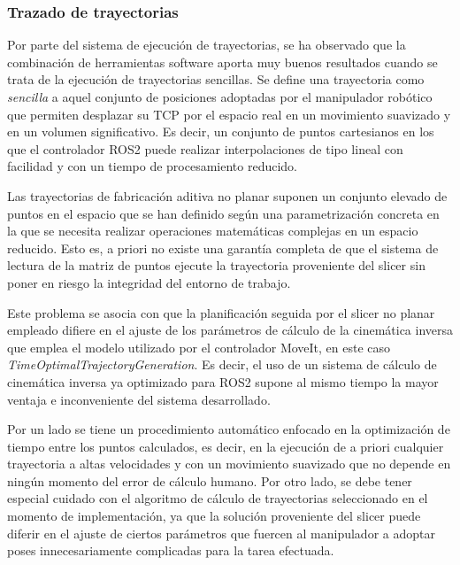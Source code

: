 \subsubsection*{Trazado de trayectorias}
\hypertarget{Trazado de trayectorias}{}
Por parte del sistema de ejecución de trayectorias, se ha observado que la combinación de herramientas software aporta muy buenos resultados cuando se trata de la ejecución de trayectorias sencillas. Se define una trayectoria como \textit{sencilla} a aquel conjunto de posiciones adoptadas por el manipulador robótico que permiten desplazar su \acrshort{TCP} por el espacio real en un movimiento suavizado y en un volumen significativo. Es decir, un conjunto de puntos cartesianos en los que el controlador ROS2 puede realizar interpolaciones de tipo lineal con facilidad y con un tiempo de procesamiento reducido.

Las trayectorias de fabricación aditiva no planar suponen un conjunto elevado de puntos en el espacio que se han definido según una parametrización concreta \cite{TFM_SanchoAmparo}\cite{paper_Q1_Alvaro_Adrian} en la que se necesita realizar operaciones matemáticas complejas en un espacio reducido. Esto es, a priori no existe una garantía completa de que el sistema de lectura de la matriz de puntos ejecute la trayectoria proveniente del slicer sin poner en riesgo la integridad del entorno de trabajo.

Este problema se asocia con que la planificación seguida por el slicer no planar empleado difiere en el ajuste de los parámetros de cálculo de la cinemática inversa que emplea el modelo utilizado por el controlador MoveIt, en este caso \textit{TimeOptimalTrajectoryGeneration}. Es decir, el uso de un sistema de cálculo de cinemática inversa ya optimizado para ROS2 supone al mismo tiempo la mayor ventaja e inconveniente del sistema desarrollado.

Por un lado se tiene un procedimiento automático enfocado en la optimización de tiempo entre los puntos calculados, es decir, en la ejecución de a priori cualquier trayectoria a altas velocidades y con un movimiento suavizado que no depende en ningún momento del error de cálculo humano. Por otro lado, se debe tener especial cuidado con el algoritmo de cálculo de trayectorias seleccionado en el momento de implementación, ya que la solución proveniente del slicer puede diferir en el ajuste de ciertos parámetros que fuercen al manipulador a adoptar poses innecesariamente complicadas para la tarea efectuada.


